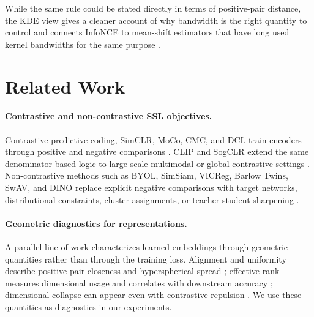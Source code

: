 \documentclass{article}
\begin{document}
While the same rule could be stated directly in terms of positive-pair distance, the KDE view gives a cleaner account of why bandwidth is the right quantity to control and connects InfoNCE to mean-shift estimators that have long used kernel bandwidths for the same purpose \citep{fukunaga1975estimation,comaniciu2002mean,hyvarinen2005estimation}.

\section{Related Work}

\paragraph{Contrastive and non-contrastive SSL objectives.}
Contrastive predictive coding, SimCLR, MoCo, CMC, and DCL train encoders through positive and negative comparisons \citep{oord2018representation,chen2020simple,he2020momentum,tian2020contrastive,yeh2022decoupled}. CLIP and SogCLR extend the same denominator-based logic to large-scale multimodal or global-contrastive settings \citep{radford2021learning,yuan2022provable}. Non-contrastive methods such as BYOL, SimSiam, VICReg, Barlow Twins, SwAV, and DINO replace explicit negative comparisons with target networks, distributional constraints, cluster assignments, or teacher-student sharpening \citep{grill2020bootstrap,chen2021exploring,bardes2022vicreg,zbontar2021barlow,caron2020unsupervised,caron2021emerging}.

\paragraph{Geometric diagnostics for representations.}
A parallel line of work characterizes learned embeddings through geometric quantities rather than through the training loss. Alignment and uniformity describe positive-pair closeness and hyperspherical spread \citep{wang2020understanding}; effective rank measures dimensional usage and correlates with downstream accuracy \citep{roy2007effective,garrido2023rankme}; dimensional collapse can appear even with contrastive repulsion \citep{jing2022understanding}. We use these quantities as diagnostics in our experiments.
\end{document}
